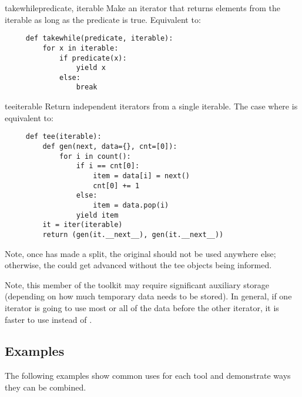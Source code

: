 \begin{funcdesc}{takewhile}{predicate, iterable}
  Make an iterator that returns elements from the iterable as long as
  the predicate is true.  Equivalent to:

  \begin{verbatim}
     def takewhile(predicate, iterable):
         for x in iterable:
             if predicate(x):
                 yield x
             else:
                 break
  \end{verbatim}
\end{funcdesc}

\begin{funcdesc}{tee}{iterable}
  Return  independent iterators from a single iterable.
  The case where  is equivalent to:

  \begin{verbatim}
     def tee(iterable):
         def gen(next, data={}, cnt=[0]):
             for i in count():
                 if i == cnt[0]:
                     item = data[i] = next()
                     cnt[0] += 1
                 else:
                     item = data.pop(i)
                 yield item
         it = iter(iterable)
         return (gen(it.__next__), gen(it.__next__))
  \end{verbatim}

  Note, once  has made a split, the original 
  should not be used anywhere else; otherwise, the  could get
  advanced without the tee objects being informed.

  Note, this member of the toolkit may require significant auxiliary
  storage (depending on how much temporary data needs to be stored).
  In general, if one iterator is going to use most or all of the data before
  the other iterator, it is faster to use  instead of
  .
\end{funcdesc}


\subsection{Examples \label{itertools-example}}

The following examples show common uses for each tool and
demonstrate ways they can be combined.

